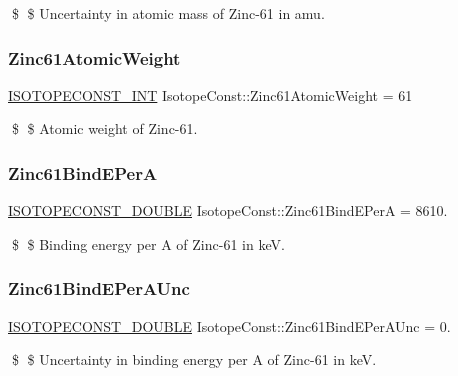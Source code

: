 \$ \$ Uncertainty in atomic mass of Zinc-\/61 in amu. \mbox{\label{group___isotope_const-_zinc-_zn61_ga24c1bd14a399abe719a7801f58474093}} 
\subsubsection{\texorpdfstring{Zinc61\+Atomic\+Weight}{Zinc61AtomicWeight}}
{\footnotesize\ttfamily \mbox{\hyperlink{group___isotope_const-_macros_ga5f18360b3e99483a35c32d789e62621c}{I\+S\+O\+T\+O\+P\+E\+C\+O\+N\+S\+T\+\_\+\+I\+NT}} Isotope\+Const\+::\+Zinc61\+Atomic\+Weight = 61}

\$ \$ Atomic weight of Zinc-\/61. \mbox{\label{group___isotope_const-_zinc-_zn61_gaa90bb22a6554a9177b31181abf41b73a}} 
\subsubsection{\texorpdfstring{Zinc61\+Bind\+E\+PerA}{Zinc61BindEPerA}}
{\footnotesize\ttfamily \mbox{\hyperlink{group___isotope_const-_macros_ga8f45a7272ce02c0b4c65c44636ed719a}{I\+S\+O\+T\+O\+P\+E\+C\+O\+N\+S\+T\+\_\+\+D\+O\+U\+B\+LE}} Isotope\+Const\+::\+Zinc61\+Bind\+E\+PerA = 8610.}

\$ \$ Binding energy per A of Zinc-\/61 in keV. \mbox{\label{group___isotope_const-_zinc-_zn61_gab8bb4fed48a564978f6355873ee0d840}} 
\subsubsection{\texorpdfstring{Zinc61\+Bind\+E\+Per\+A\+Unc}{Zinc61BindEPerAUnc}}
{\footnotesize\ttfamily \mbox{\hyperlink{group___isotope_const-_macros_ga8f45a7272ce02c0b4c65c44636ed719a}{I\+S\+O\+T\+O\+P\+E\+C\+O\+N\+S\+T\+\_\+\+D\+O\+U\+B\+LE}} Isotope\+Const\+::\+Zinc61\+Bind\+E\+Per\+A\+Unc = 0.}

\$ \$ Uncertainty in binding energy per A of Zinc-\/61 in keV. \mbox{\label{group___isotope_const-_zinc-_zn61_ga39f842817a994473c31ac341c487598b}} 
